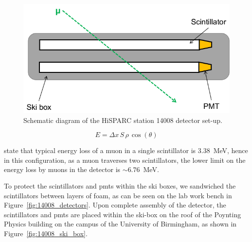 \begin{figure}
	\center
	\includegraphics[width=0.5\columnwidth]{14008_config.png}
	\caption{Schematic diagram of the HiSPARC station 14008 detector set-up.}
	\label{fig:14008_config}
\end{figure}

\begin{equation}
E = \Delta x \, S \, \rho \, \cos(\theta)
\label{eq:energy_loss}
\end{equation}

\cite{bartels_hisparc_2012} state that typical energy loss of a muon in a single scintillator is $3.38$~MeV, hence in this configuration, as a muon traverses two scintillators, the lower limit on the energy loss by muons in the detector is $\sim 6.76$~MeV.

To protect the scintillators and \glspl{pmt} within the ski boxes, we sandwiched the scintillators between layers of foam, as can be seen on the lab work bench in Figure~\ref{fig:14008_detectors}. Upon complete assembly of the detector, the scintillators and \glspl{pmt} are placed within the ski-box on the roof of the Poynting Physics building on the campus of the University of Birmingham, as shown in Figure~\ref{fig:14008_ski_box}.


